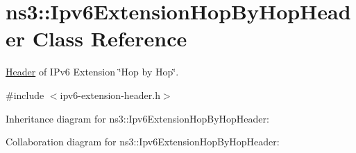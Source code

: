 \hypertarget{classns3_1_1Ipv6ExtensionHopByHopHeader}{}\section{ns3\+:\+:Ipv6\+Extension\+Hop\+By\+Hop\+Header Class Reference}
\label{classns3_1_1Ipv6ExtensionHopByHopHeader}


\hyperlink{classns3_1_1Header}{Header} of I\+Pv6 Extension \char`\"{}\+Hop by Hop\char`\"{}.  




{\ttfamily \#include $<$ipv6-\/extension-\/header.\+h$>$}



Inheritance diagram for ns3\+:\+:Ipv6\+Extension\+Hop\+By\+Hop\+Header\+:


Collaboration diagram for ns3\+:\+:Ipv6\+Extension\+Hop\+By\+Hop\+Header\+:

